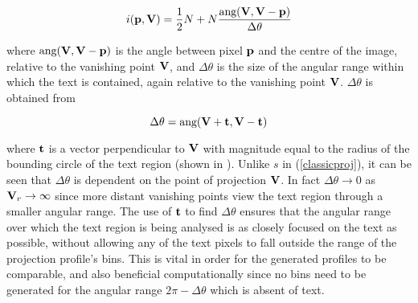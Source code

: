 \begin{equation} \label{persproj} i( { \bf p,{ \bf V } } ) = \frac{1}{2} N + N \frac{ \mbox{ang}({ \bf V },{ \bf V }-{ \bf p }) }{ \Delta \theta } \end{equation}

{ \parindent 0mm 
where $\mbox{ang}({ \bf V },{ \bf V }-{ \bf p })$ is the angle
between pixel ${ \bf p }$ and the centre of the image, relative to the vanishing
point ${ \bf V }$, and $\Delta \theta$ is the size of the angular range within
which the text is contained, again relative to the vanishing point
${ \bf V }$. $ \Delta \theta$ is obtained from 
}

\begin{equation} \Delta \theta = \mbox{ang}({ \bf V }+{ \bf t },{ \bf V }-{ \bf t }) \end{equation}

{ \parindent 0mm 
where ${ \bf t }$ is a vector perpendicular to ${ \bf V }$ with
magnitude equal to the radius of the bounding circle of the text region (shown
in ).  Unlike $s$ in (\ref{classicproj}), it can be seen that
$\Delta \theta$ is dependent on the point of projection ${ \bf V }$.  In fact
$\Delta \theta \rightarrow 0$ as ${ \bf V }_r \rightarrow \infty$ since more
distant vanishing points view the text region through a smaller angular range.
The use of ${ \bf t }$ to find $\Delta\theta$ ensures that the angular range
over which the text region is being analysed is as closely focused on the text
as possible, without allowing any of the text pixels to fall outside the range
of the projection profile's bins.  This is vital in order for the generated
profiles to be comparable, and also beneficial computationally since no bins
need to be generated for the angular range $2 {\pi}-\Delta \theta$ which is
absent of text.
}

\begin{comment}
Relative to a vanishing point $\myvec{V}$, the text region under examination
will fall entirely within a range of angles, forming an arc or wedge shape
extending from $\myvec{V}$.  The two angles which form this enclosing wedge are
used as the left and right bounds of the projection profile.  Hence all pixels
in the text region will map correctly to a bin in the projection profile, whilst
ensuring that the text fully spans the projection and a useful profile is
obtained.  Without this resizing of the window over which to collect the
projection profile for each vanishing point, the profiles obtained will not
relate to each other.  This is because more distant vanishing points find the
text lying within a smaller angular range, which will produce a drastically
different projection unless we focus on the relevant range.
\end{comment}


